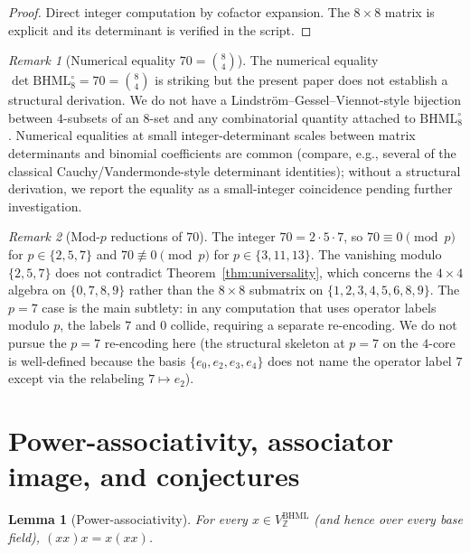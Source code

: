 \documentclass[11pt,reqno]{amsart}
\theoremstyle{plain}
\newtheorem{lemma}[theorem]{Lemma}
\theoremstyle{definition}
\theoremstyle{remark}
\newtheorem*{remark}{Remark}
\newcommand{\Z}{\mathbb{Z}}
\newcommand{\BHML}{\mathrm{BHML}}
\begin{document}
\begin{proof}
Direct integer computation by cofactor expansion. The $8 \times 8$
matrix is explicit and its determinant is verified in the script.
\end{proof}

\begin{remark}[Numerical equality $70 = \binom{8}{4}$]
The numerical equality $\det \BHML_{8}^{\circ} = 70 = \binom{8}{4}$
is striking but the present paper does not establish a structural
derivation. We do not have a Lindström--Gessel--Viennot-style
bijection between $4$-subsets of an $8$-set and any combinatorial
quantity attached to $\BHML_{8}^{\circ}$. Numerical equalities at
small integer-determinant scales between matrix determinants and
binomial coefficients are common (compare, e.g., several of the
classical Cauchy/Vandermonde-style determinant identities); without
a structural derivation, we report the equality as a small-integer
coincidence pending further investigation.
\end{remark}

\begin{remark}[Mod-$p$ reductions of $70$]
The integer $70 = 2 \cdot 5 \cdot 7$, so $70 \equiv 0 \pmod{p}$ for
$p \in \{2, 5, 7\}$ and $70 \not\equiv 0 \pmod{p}$ for $p \in
\{3, 11, 13\}$. The vanishing modulo $\{2, 5, 7\}$ does not
contradict Theorem~\ref{thm:universality}, which concerns the
$4 \times 4$ algebra on $\{0, 7, 8, 9\}$ rather than the
$8 \times 8$ submatrix on $\{1, 2, 3, 4, 5, 6, 8, 9\}$. The $p = 7$
case is the main subtlety: in any computation that uses operator
labels modulo $p$, the labels $7$ and $0$ collide, requiring a
separate re-encoding. We do not pursue the $p = 7$ re-encoding here
(the structural skeleton at $p = 7$ on the $4$-core is well-defined
because the basis $\{e_{0}, e_{2}, e_{3}, e_{4}\}$ does not name
the operator label $7$ except via the relabeling
$7 \mapsto e_{2}$).
\end{remark}

\section{Power-associativity, associator image, and conjectures}
\label{sec:assoc}

\begin{lemma}[Power-associativity]
\label{lem:pa}
For every $x \in V^{\BHML}_{\Z}$ (and hence over every base field),
$(x x) x = x (x x)$.
\end{lemma}
\end{document}
